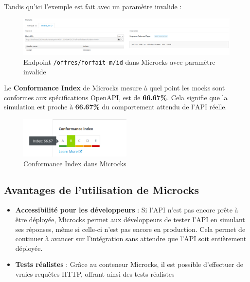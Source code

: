 \documentclass[11pt]{article}
\begin{document}
		Tandis qu'ici l'exemple est fait avec un paramètre invalide :
		
			\begin{figure}[H]
			\centering
			\includegraphics[width=\textwidth]{asset/microcks_invalid.png}
			\caption{Endpoint \texttt{/offres/forfait-m/{id}} dans Microcks avec paramètre invalide}
			\label{fig:endpoint-offres/forfait-m/{id}}
		\end{figure}
		
		Le \textbf{Conformance Index} de Microcks mesure à quel point les mocks sont conformes aux spécifications OpenAPI, est de \textbf{66.67\%}. Cela signifie que la simulation est proche à \textbf{66.67\%} du comportement attendu de l'API réelle.
		
		\begin{figure}[H]
			\centering
			\includegraphics[width=0.5\textwidth]{asset/conformance-index.png}
			\caption{Conformance Index dans Microcks}
			\label{fig:conformance-index}
		\end{figure}
		
		\subsection*{Avantages de l'utilisation de Microcks}
		
		\begin{itemize}
			\item \textbf{Accessibilité pour les développeurs} : Si l'API n'est pas encore prête à être déployée, Microcks permet aux développeurs de tester l'API en simulant ses réponses, même si celle-ci n'est pas encore en production. Cela permet de continuer à avancer sur l'intégration sans attendre que l'API soit entièrement déployée.
			\item \textbf{Tests réalistes} : Grâce au conteneur Microcks, il est possible d'effectuer de vraies requêtes HTTP, offrant ainsi des tests réalistes
		\end{itemize}
		
\end{document}
